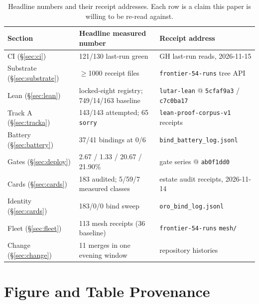 ﻿\documentclass[11pt]{article}
\begin{document}
\begin{table}[htbp]
\centering
\small
\begin{tabular}{lll}
\toprule
\textbf{Section} & \textbf{Headline measured number} & \textbf{Receipt address} \\
\midrule
CI (\S\ref{sec:ci}) & 121/130 last-run green & GH last-run reads, 2026-11-15 \\
Substrate (\S\ref{sec:substrate}) & $\geq$1000 receipt files & \texttt{frontier-54-runs} tree API \\
Lean (\S\ref{sec:lean}) & locked-eight registry; 749/14/163 baseline & \texttt{lutar-lean} @ \texttt{5cfaf9a3} / \texttt{c7c0ba17} \\
Track A (\S\ref{sec:tracka}) & 143/143 attempted; 65 \texttt{sorry} & \texttt{lean-proof-corpus-v1} receipts \\
Battery (\S\ref{sec:battery}) & 37/41 bindings at 0/6 & \texttt{bind\_battery\_log.jsonl} \\
Gates (\S\ref{sec:deploy}) & 2.67 / 1.33 / 20.67 / 21.90\% & gate series @ \texttt{ab0f1dd0} \\
Cards (\S\ref{sec:cards}) & 183 audited; 5/59/7 measured classes & estate audit receipts, 2026-11-14 \\
Identity (\S\ref{sec:cards}) & 183/0/0 bind sweep & \texttt{oro\_bind\_log.jsonl} \\
Fleet (\S\ref{sec:fleet}) & 113 mesh receipts (36 baseline) & \texttt{frontier-54-runs} \texttt{mesh/} \\
Change (\S\ref{sec:change}) & 11 merges in one evening window & repository histories \\
\bottomrule
\end{tabular}
\caption{Headline numbers and their receipt addresses. Each row is a claim this paper is willing to be re-read against.}
\label{tab:recap}
\end{table}

\appendix
\section{Figure and Table Provenance}
\label{app:provenance}
\end{document}
